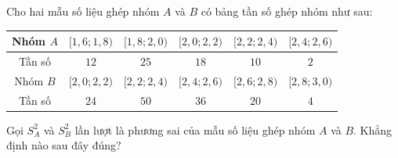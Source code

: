 \begin{ex}
Cho hai mẫu số liệu ghép nhóm $A$ và $B$ có bảng tần số ghép nhóm như sau:
\begin{center}
\renewcommand{\arraystretch}{1.25}
\begin{tabular}{|c|c|c|c|c|c|}
\hline
Nhóm $A$ & $[1{,}6;1{,}8)$ & $[1{,}8;2{,}0)$ & $[2{,}0;2{,}2)$ & $[2{,}2;2{,}4)$ & $[2{,}4;2{,}6)$ \\
\hline
Tần số & $12$ & $25$ & $18$ & $10$ & $2$ \\
\hline
Nhóm $B$ & $[2{,}0;2{,}2)$ & $[2{,}2;2{,}4)$ & $[2{,}4;2{,}6)$ & $[2{,}6;2{,}8)$ & $[2{,}8;3{,}0)$ \\
\hline
Tần số & $24$ & $50$ & $36$ & $20$ & $4$ \\
\hline
\end{tabular}
\end{center}
Gọi $S_A^2$ và $S_B^2$ lần lượt là phương sai của mẫu số liệu ghép nhóm $A$ và $B$. Khẳng định nào sau đây đúng?
\end{ex}

